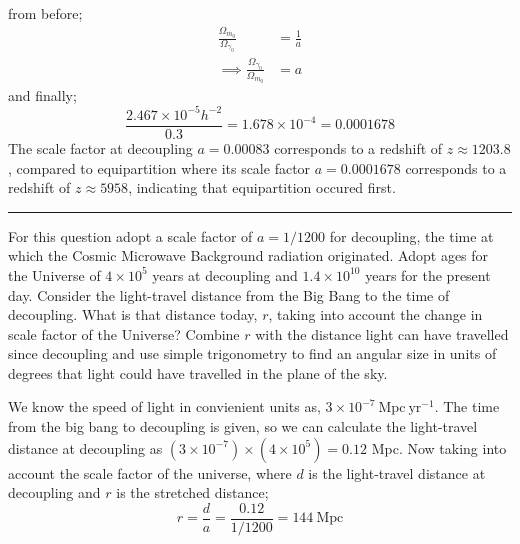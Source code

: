 \documentclass[11pt, a4paper, answers]{exam}
\begin{document}
\begin{questions}
\begin{solution}
\begin{equation*}
        \end{equation*}
        from before;
        \begin{align*}
            \frac{\Omega_{m_0}}{\Omega_{\gamma_0}}          & = \frac{1}{a} \\
            \implies \frac{\Omega_{\gamma_0}}{\Omega_{m_0}} & = a
        \end{align*}
        and finally;
        \begin{equation*}
            \frac{2.467 \times10^{-5}h^{-2}}{0.3} = 1.678\times10^{-4} = 0.0001678
        \end{equation*}
        The scale factor at decoupling $a = 0.00083$ corresponds to a redshift of $z \approx
            1203.8$, compared to equipartition where its scale factor $a = 0.0001678$ corresponds to a
        redshift of $z \approx 5958$, indicating that equipartition occured first.
    \end{solution}

    \begin{center}
        \rule{8cm}{0.4pt}
    \end{center}
    \newpage


    \question For this question adopt a scale factor of $a = 1/1200$ for decoupling, the time at which the
    Cosmic Microwave Background radiation originated. Adopt ages for the Universe of $4\times 10^5$
    years at decoupling and $1.4\times10^{10}$ years for the present day. Consider the light-travel distance
    from the Big Bang to the time of decoupling. What is that distance today, $r$, taking into
    account the change in scale factor of the Universe? Combine $r$ with the distance light can
    have travelled since decoupling and use simple trigonometry to find an angular size in units of
    degrees that light could have travelled in the plane of the sky.

    \begin{solution}
        We know the speed of light in convienient units as, $3\times10^{-7}\:\text{Mpc}\:
            \text{yr}^{-1}$.
        The time from the big bang to decoupling is given, so we can calculate the light-travel
        distance at decoupling as $(3\times10^{-7}) \times (4\times 10^5) = 0.12$ Mpc. Now
        taking into account the scale factor of the universe, where $d$ is the light-travel
        distance at decoupling and $r$ is the stretched distance;
        \begin{equation*}
            r = \frac{d}{a} = \frac{0.12}{1/1200} = 144 \:\text{Mpc}
        \end{equation*}


\end{solution}
\end{questions}
\end{document}
